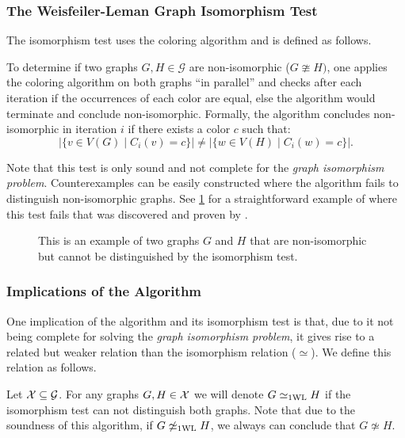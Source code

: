 \subsubsection{The Weisfeiler-Leman Graph Isomorphism Test}
The isomorphism test uses the \wl coloring algorithm and is defined as follows.

\begin{definition}
    To determine if two graphs $G, H \in \mathcal{G}$ are non-isomorphic ($G \ncong H)$, one applies the \wl coloring algorithm on both graphs ``in parallel'' and checks after each iteration if the occurrences of each color are equal, else the algorithm would terminate and conclude non-isomorphic. Formally, the algorithm concludes non-isomorphic in iteration $i$ if there exists a color $c$ such that: 
    \begin{equation*}
        |\{ v \in V(G) \mid C_i(v) = c\} | \neq |\{ w \in V(H) \mid C_i(w) = c\} |.
    \end{equation*}
\end{definition}

Note that this test is only sound and not complete for the \textit{graph isomorphism problem}. Counterexamples can be easily constructed where the algorithm fails to distinguish non-isomorphic graphs. See \cref{1-WL Counter Example} for a straightforward example of where this test fails that was discovered and proven by \cite{Cai1992}.
\begin{figure}[H]
    \centering
    
    \caption{This is an example of two graphs $G$ and $H$ that are non-isomorphic but cannot be distinguished by the \wl isomorphism test.}
    \label{1-WL Counter Example}
\end{figure}

\subsubsection{Implications of the \wl Algorithm}
One implication of the \wl algorithm and its isomorphism test is that, due to it not being complete for solving the \textit{graph isomorphism problem}, it gives rise to a related but weaker relation than the isomorphism relation ($\simeq$). We define this relation as follows.

\begin{definition}[\wl Relation]
    Let $\mathcal{X} \subseteq \mathcal{G}$. For any graphs $G,H \in \mathcal{X}$ we will denote $G \simeq_{\text{1WL}} H$ if the \wl isomorphism test can not distinguish both graphs. Note that due to the soundness of this algorithm, if $G \not\simeq_{\text{1WL}} H$, we always can conclude that $G \not\simeq H$.
\end{definition}

